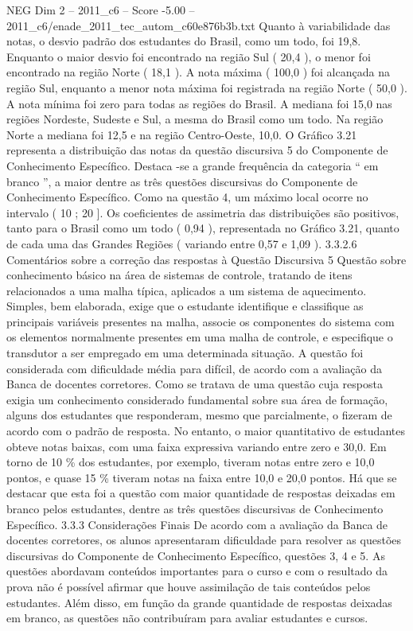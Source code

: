\begin{textsample}{NEG Dim 2 – 2011\_c6 – Score -5.00 – 2011\_c6/enade\_2011\_tec\_autom\_c60e876b3b.txt}
Quanto à variabilidade das notas, o desvio padrão dos estudantes do Brasil, como um todo, foi 19,8.
Enquanto o maior desvio foi encontrado na região Sul ( 20,4 ), o menor foi encontrado na região Norte ( 18,1 ).
A nota máxima ( 100,0 ) foi alcançada na região Sul, enquanto a menor nota máxima foi registrada na região Norte ( 50,0 ).
A nota mínima foi zero para todas as regiões do Brasil.
A mediana foi 15,0 nas regiões Nordeste, Sudeste e Sul, a mesma do Brasil como um todo.
Na região Norte a mediana foi 12,5 e na região Centro-Oeste, 10,0.
O Gráfico 3.21 representa a distribuição das notas da questão discursiva 5 do Componente de Conhecimento Específico.
Destaca -se a grande frequência da categoria “ em branco ”, a maior dentre as três questões discursivas do Componente de Conhecimento Específico.
Como na questão 4, um máximo local ocorre no intervalo ( 10 ; 20 ].
Os coeficientes de assimetria das distribuições são positivos, tanto para o Brasil como um todo ( 0,94 ), representada no Gráfico 3.21, quanto de cada uma das Grandes Regiões ( variando entre 0,57 e 1,09 ). 3.3.2.6 Comentários sobre a correção das respostas à Questão Discursiva 5 Questão sobre conhecimento básico na área de sistemas de controle, tratando de itens relacionados a uma malha típica, aplicados a um sistema de aquecimento.
Simples, bem elaborada, exige que o estudante identifique e classifique as principais variáveis presentes na malha, associe os componentes do sistema com os elementos normalmente presentes em uma malha de controle, e especifique o transdutor a ser empregado em uma determinada situação.
A questão foi considerada com dificuldade média para difícil, de acordo com a avaliação da Banca de docentes corretores.
Como se tratava de uma questão cuja resposta exigia um conhecimento considerado fundamental sobre sua área de formação, alguns dos estudantes que responderam, mesmo que parcialmente, o fizeram de acordo com o padrão de resposta.
No entanto, o maior quantitativo de estudantes obteve notas baixas, com uma faixa expressiva variando entre zero e 30,0.
Em torno de 10 \% dos estudantes, por exemplo, tiveram notas entre zero e 10,0 pontos, e quase 15 \% tiveram notas na faixa entre 10,0 e 20,0 pontos.
Há que se destacar que esta foi a questão com maior quantidade de respostas deixadas em branco pelos estudantes, dentre as três questões discursivas de Conhecimento Específico. 3.3.3 Considerações Finais De acordo com a avaliação da Banca de docentes corretores, os alunos apresentaram dificuldade para resolver as questões discursivas do Componente de Conhecimento Específico, questões 3, 4 e 5.
As questões abordavam conteúdos importantes para o curso e com o resultado da prova não é possível afirmar que houve assimilação de tais conteúdos pelos estudantes.
Além disso, em função da grande quantidade de respostas deixadas em branco, as questões não contribuíram para avaliar estudantes e cursos.

\end{textsample}

